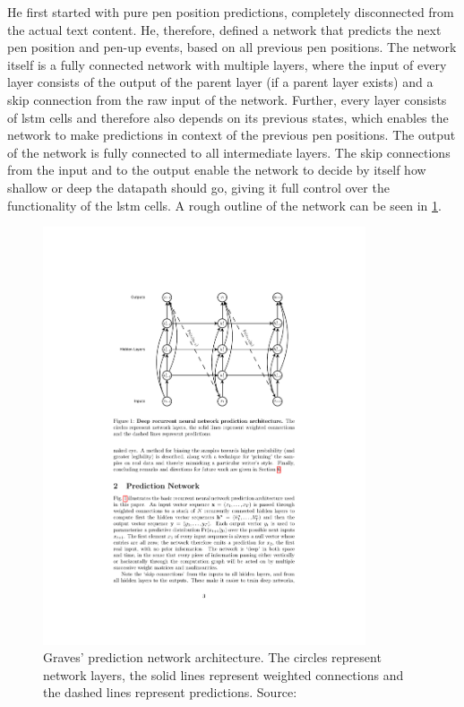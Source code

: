 He first started with pure pen position predictions, completely disconnected from the actual text content. He, therefore, defined a network that predicts the next pen position and pen-up events, based on all previous pen positions. The network itself is a fully connected network with multiple layers, where the input of every layer consists of the output of the parent layer (if a parent layer exists) and a skip connection from the raw input of the network. Further, every layer consists of \gls{lstm} cells and therefore also depends on its previous states, which enables the network to make predictions in context of the previous pen positions. The output of the network is fully connected to all intermediate layers. The skip connections from the input and to the output enable the network to decide by itself how shallow or deep the datapath should go, giving it full control over the functionality of the \gls{lstm} cells. A rough outline of the network can be seen in \cref{fig:gravesPreditionNetwork}.

\begin{figure}
  \centering
  \includegraphics[width=0.85\textwidth]{../assets/style_transfer/graves_prediction_network.pdf}
  \caption[Graves' prediction network architecture]{Graves' prediction network architecture. The circles represent network layers, the solid lines represent weighted connections and the dashed lines represent predictions. Source:~\cite{graves}}
  \label{fig:gravesPreditionNetwork}
\end{figure}

